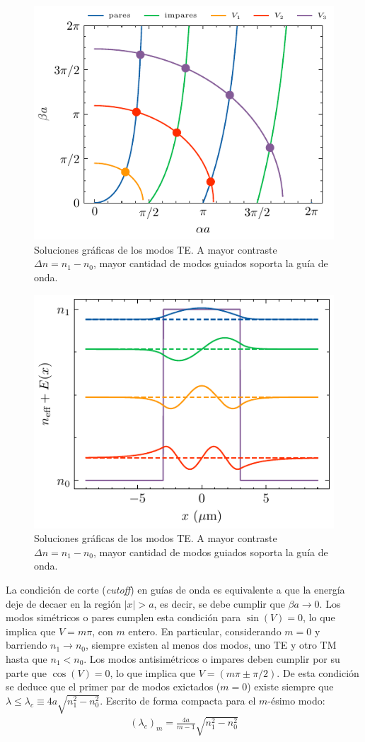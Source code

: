 \begin{figure}[H]
	\centering
	\includegraphics[width=0.7\linewidth]{media/slabgraphical.pdf}
	\caption[Soluciones gráficas de los modos TE]{Soluciones gráficas de los modos TE. A mayor contraste $\Delta n = n_1-n_0$, mayor cantidad de modos guiados soporta la guía de onda.}
\end{figure}

\begin{figure}[H]
	\centering
	\includegraphics[width=0.7\linewidth]{media/TETMfields.pdf}
	\caption[Soluciones gráficas de los modos TE]{Soluciones gráficas de los modos TE. A mayor contraste $\Delta n = n_1-n_0$, mayor cantidad de modos guiados soporta la guía de onda.}
\end{figure}

La condición de corte (\textit{cutoff}) en guías de onda es equivalente a que la energía deje de decaer en la región $|x| > a$, es decir, se debe cumplir que $\beta a \to 0$. 
Los modos simétricos o pares cumplen esta condición para $\sin(V) = 0$, lo que implica que $V = m \pi$, con $m$ entero. En particular, considerando $m=0$  y barriendo $n_1 \to n_0$, siempre existen al menos dos modos, uno TE y otro TM hasta que $n_1 < n_0$.  
Los modos antisimétricos o impares deben cumplir por su parte que $\cos(V) = 0$, lo que implica que $V = (m\pi \pm \pi/2)$. De esta condición se deduce que el primer par de modos exictados ($m=0$) existe siempre que $\lambda \le \lambda_c \equiv 4a\sqrt{n_1^2-n_0^2}$. Escrito de forma compacta para el $m$-ésimo modo:
\begin{align*}
	 (\lambda_c)_m = \frac{4a}{m-1}  \sqrt{n_1^2-n_0^2}
\end{align*}

